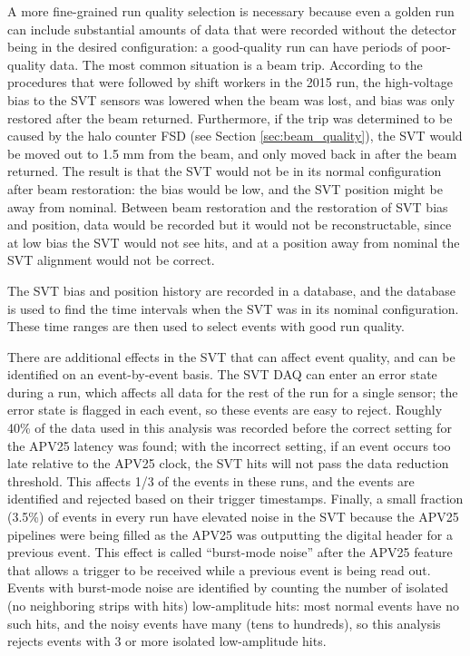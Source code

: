 A more fine-grained run quality selection is necessary because even a golden run can include substantial amounts of data that were recorded without the detector being in the desired configuration: a good-quality run can have periods of poor-quality data.
The most common situation is a beam trip.
According to the procedures that were followed by shift workers in the 2015 run, the high-voltage bias to the SVT sensors was lowered when the beam was lost, and bias was only restored after the beam returned.
Furthermore, if the trip was determined to be caused by the halo counter FSD (see Section \ref{sec:beam_quality}), the SVT would be moved out to 1.5 mm from the beam, and only moved back in after the beam returned.
The result is that the SVT would not be in its normal configuration after beam restoration: the bias would be low, and the SVT position might be away from nominal.
Between beam restoration and the restoration of SVT bias and position, data would be recorded but it would not be reconstructable, since at low bias the SVT would not see hits, and at a position away from nominal the SVT alignment would not be correct.

The SVT bias and position history are recorded in a database, and the database is used to find the time intervals when the SVT was in its nominal configuration.
These time ranges are then used to select events with good run quality.

There are additional effects in the SVT that can affect event quality, and can be identified on an event-by-event basis.
The SVT DAQ can enter an error state during a run, which affects all data for the rest of the run for a single sensor; the error state is flagged in each event, so these events are easy to reject.
Roughly 40\% of the data used in this analysis was recorded before the correct setting for the APV25 latency was found; with the incorrect setting, if an event occurs too late relative to the APV25 clock, the SVT hits will not pass the data reduction threshold.
This affects 1/3 of the events in these runs, and the events are identified and rejected based on their trigger timestamps.
Finally, a small fraction (3.5\%) of events in every run have elevated noise in the SVT because the APV25 pipelines were being filled as the APV25 was outputting the digital header for a previous event.
This effect is called ``burst-mode noise'' after the APV25 feature that allows a trigger to be received while a previous event is being read out.
Events with burst-mode noise are identified by counting the number of isolated (no neighboring strips with hits) low-amplitude hits: most normal events have no such hits, and the noisy events have many (tens to hundreds), so this analysis rejects events with 3 or more isolated low-amplitude hits.


